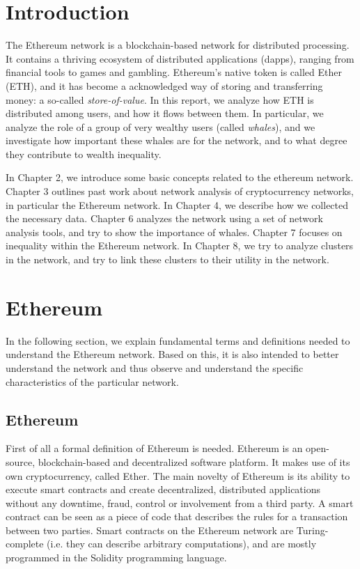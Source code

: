 \documentclass[10pt,a4paper]{article}
\begin{document}
\begin{multicols}{2}

\section{Introduction}
The Ethereum network is a blockchain-based network for distributed processing. It contains a thriving ecosystem of distributed applications (dapps), ranging from financial tools to games and gambling. Ethereum's native token is called Ether (ETH), and it has become a acknowledged way of storing and transferring money: a so-called \textit{store-of-value}. In this report, we analyze how ETH is distributed among users, and how it flows between them. In particular, we analyze the role of a group of very wealthy users (called \textit{whales}), and we investigate how important these whales are for the network, and to what degree they contribute to wealth inequality.

In Chapter 2, we introduce some basic concepts related to the ethereum network. Chapter 3 outlines past work about network analysis of cryptocurrency networks, in particular the Ethereum network. In Chapter 4, we describe how we collected the necessary data. Chapter 6 analyzes the network using a set of network analysis tools, and try to show the importance of whales. Chapter 7 focuses on inequality within the Ethereum network. In Chapter 8, we try to analyze clusters in the network, and try to link these clusters to their utility in the network. 

\section{Ethereum}

In the following section, we explain fundamental terms and definitions needed to understand the Ethereum network. Based on this, it is also intended to better understand the network and thus observe and understand the specific characteristics of the particular network. 

\subsection{Ethereum}
First of all a formal definition of Ethereum is needed. Ethereum is an open-source, blockchain-based and decentralized software platform. It makes use of its own cryptocurrency, called Ether. The main novelty of Ethereum is its ability to execute smart contracts and create decentralized, distributed applications without any downtime, fraud, control or involvement from a third party. A smart contract can be seen as a piece of code that describes the rules for a transaction between two parties. Smart contracts on the Ethereum network are Turing-complete (i.e. they can describe arbitrary computations), and are mostly programmed in the Solidity programming language. 

\end{multicols}
\end{document}
